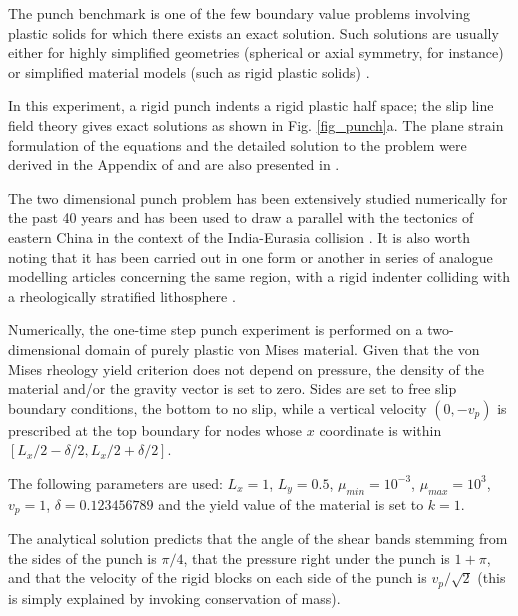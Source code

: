 

The punch benchmark is one of the few boundary value problems involving plastic solids for which there exists an exact solution. 
Such solutions are usually either for highly simplified geometries (spherical or axial symmetry, for instance) or simplified material models (such as rigid plastic solids) \cite{kacha04}.

In this experiment, a rigid punch indents a rigid plastic half space; the slip line field theory gives 
exact solutions as shown in Fig. \ref{fig_punch}a. 
The plane strain formulation of the equations and the detailed solution to the problem were derived in the Appendix of \cite{thfb08} and are also presented in \cite{gepd98}.

The two dimensional punch problem has been extensively studied numerically for the past 40 years 
\cite{zihl75,zihp95,chpe01,chan99,huhy99,yuti06,bufs08,raab07} and has been used to draw a parallel with the tectonics of eastern China in the context of the 
India-Eurasia collision \cite{tamo76,mota77}.
It is also worth noting that it has been carried out in one form or another in series of 
analogue modelling articles 
concerning the same region, with a rigid indenter colliding with a rheologically stratified lithosphere \cite{peta88,daco88,jodc90}.

 
Numerically, the one-time step punch experiment is performed on a two-dimensional
domain of purely plastic von Mises material. 
Given that the von Mises rheology yield criterion does not depend on pressure, the density of the material and/or the gravity vector is set to zero. Sides are set to free slip boundary conditions, the bottom to no slip, while a vertical velocity $(0,-v_p)$ is prescribed at the top boundary for nodes whose $x$ coordinate is within $[L_x/2-\delta/2,L_x/2+\delta/2]$. 

The following parameters are used: $L_x=1$, $L_y=0.5$, $\mu_{min}=10^{-3}$, 
$\mu_{max}=10^3$, $v_p=1$, $\delta=0.123456789$ 
and the yield value of the material is set to $k=1$. 

The analytical solution predicts that the angle of the shear bands stemming from the sides of the punch 
is $\pi/4$, that the pressure right under the punch is $1+\pi$, 
and that the velocity of the rigid blocks on each side of the punch is $v_p/\sqrt{2}$ 
(this is simply explained by invoking conservation of mass).

